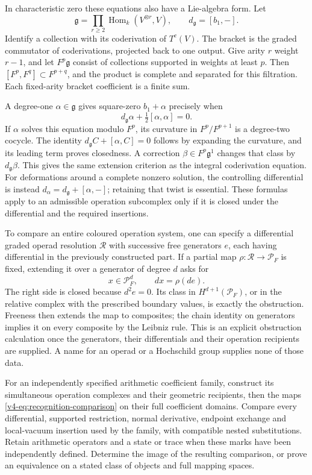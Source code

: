 In characteristic zero these equations also have a Lie-algebra
form. Let
\[
 \mathfrak g=\prod_{r\geq2}
                   \operatorname{Hom}_k(V^{\otimes r},V),
 \qquad d_{\mathfrak g}=[b_1,-].
\]
Identify a collection with its coderivation of \(T^c(V)\).
The bracket is the graded commutator of coderivations, projected
back to one output. Give arity \(r\) weight \(r-1\), and
let \(F^p\mathfrak g\) consist of collections supported in
weights at least \(p\). Then
\([F^p,F^q]\subset F^{p+q}\), and the product is complete
and separated for this filtration. Each fixed-arity bracket
coefficient is a finite sum.

A degree-one \(\alpha\in\mathfrak g\) gives square-zero
\(b_1+\alpha\) precisely when
\[
 d_{\mathfrak g}\alpha+\tfrac12[\alpha,\alpha]=0.
\]
If \(\alpha\) solves this equation modulo \(F^p\), its
curvature in \(F^p/F^{p+1}\) is a degree-two cocycle.
The identity
\(d_{\mathfrak g}C+[\alpha,C]=0\) follows by expanding the
curvature, and its leading term proves closedness. A correction
\(\beta\in F^p\mathfrak g^1\) changes that class by
\(d_{\mathfrak g}\beta\). This gives the same extension
criterion as the integral coderivation equation. For
deformations around a complete nonzero solution, the controlling
differential is instead
\(d_\alpha=d_{\mathfrak g}+[\alpha,-]\); retaining that twist
is essential. These formulas apply to an admissible operation
subcomplex only if it is closed under the differential and the
required insertions.

To compare an entire coloured operation system, one can specify
a differential graded operad resolution \(\mathcal R\) with
successive free generators \(e\), each having differential in
the previously constructed part. If a partial map
\(\rho:\mathcal R\to\mathcal P_F\) is fixed, extending it
over a generator of degree \(d\) asks for
\[
 x\in\mathcal P_F^d,\qquad dx=\rho(de).
\]
The right side is closed because \(d^2e=0\). Its class in
\(H^{d+1}(\mathcal P_F)\), or in the relative complex with
the prescribed boundary values, is exactly the obstruction.
Freeness then extends the map to composites; the chain identity
on generators implies it on every composite by the Leibniz
rule. This is an explicit obstruction calculation once the
generators, their differentials and their operation recipients
are supplied. A name for an operad or a Hochschild group supplies
none of those data.

\begin{question}
\label{v4-qn:recognition-arithmetic}
For an independently specified arithmetic coefficient family,
construct its simultaneous operation complexes and their
geometric recipients, then the maps
\eqref{v4-eq:recognition-comparison} on their full coefficient
domains. Compare every differential, supported restriction,
normal derivative, endpoint exchange and local-vacuum insertion
used by the family, with compatible nested substitutions.
Retain arithmetic operators and a state or trace when these
marks have been independently defined. Determine the image of
the resulting comparison, or prove an equivalence on a stated
class of objects and full mapping spaces.
\end{question}

